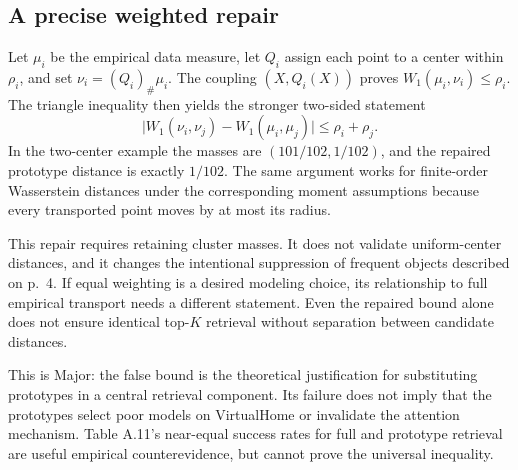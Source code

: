 \documentclass[10pt]{article}
\begin{document}
\subsection*{A precise weighted repair}
Let \(\mu_i\) be the empirical data measure, let \(Q_i\) assign each point to a center within \(\rho_i\), and set \(\nu_i=(Q_i)_\#\mu_i\). The coupling \((X,Q_i(X))\) proves \(W_1(\mu_i,\nu_i)\le\rho_i\). The triangle inequality then yields the stronger two-sided statement \[\big|W_1(\nu_i,\nu_j)-W_1(\mu_i,\mu_j)\big|
 \le\rho_i+\rho_j.\] In the two-center example the masses are \((101/102,1/102)\), and the repaired prototype distance is exactly \(1/102\). The same argument works for finite-order Wasserstein distances under the corresponding moment assumptions because every transported point moves by at most its radius.\par
This repair requires retaining cluster masses. It does not validate uniform-center distances, and it changes the intentional suppression of frequent objects described on p. 4. If equal weighting is a desired modeling choice, its relationship to full empirical transport needs a different statement. Even the repaired bound alone does not ensure identical top-\(K\) retrieval without separation between candidate distances.\par
This is Major: the false bound is the theoretical justification for substituting prototypes in a central retrieval component. Its failure does not imply that the prototypes select poor models on VirtualHome or invalidate the attention mechanism. Table A.11’s near-equal success rates for full and prototype retrieval are useful empirical counterevidence, but cannot prove the universal inequality.\par
\end{document}
